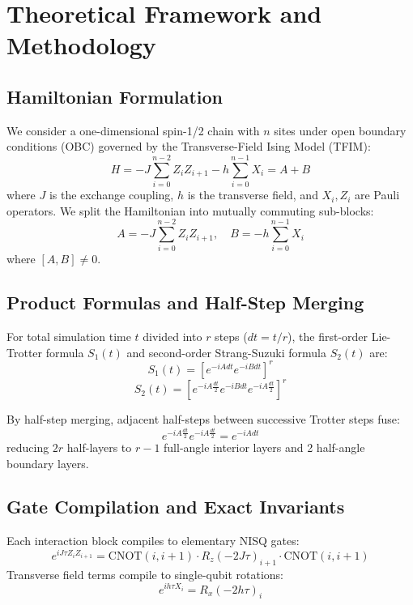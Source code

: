 \documentclass[conference]{IEEEtran}
\begin{document}
\section{Theoretical Framework and Methodology}
\subsection{Hamiltonian Formulation}
We consider a one-dimensional spin-1/2 chain with $n$ sites under open boundary conditions (OBC) governed by the Transverse-Field Ising Model (TFIM):
\begin{equation}
H = -J \sum_{i=0}^{n-2} Z_i Z_{i+1} - h \sum_{i=0}^{n-1} X_i = A + B
\label{eq:tfim}
\end{equation}
where $J$ is the exchange coupling, $h$ is the transverse field, and $X_i, Z_i$ are Pauli operators. We split the Hamiltonian into mutually commuting sub-blocks:
\begin{equation}
A = -J \sum_{i=0}^{n-2} Z_i Z_{i+1}, \quad B = -h \sum_{i=0}^{n-1} X_i
\end{equation}
where $[A, B] \ne 0$.

\subsection{Product Formulas and Half-Step Merging}
For total simulation time $t$ divided into $r$ steps ($dt = t/r$), the first-order Lie-Trotter formula $S_1(t)$ and second-order Strang-Suzuki formula $S_2(t)$ are:
\begin{equation}
S_1(t) = \left[ e^{-i A dt} e^{-i B dt} \right]^r
\end{equation}
\begin{equation}
S_2(t) = \left[ e^{-i A \frac{dt}{2}} e^{-i B dt} e^{-i A \frac{dt}{2}} \right]^r
\end{equation}

By half-step merging, adjacent half-steps between successive Trotter steps fuse:
\begin{equation}
e^{-i A \frac{dt}{2}} e^{-i A \frac{dt}{2}} = e^{-i A dt}
\end{equation}
reducing $2r$ half-layers to $r-1$ full-angle interior layers and 2 half-angle boundary layers.

\subsection{Gate Compilation and Exact Invariants}
Each interaction block compiles to elementary NISQ gates:
\begin{equation}
e^{i J \tau Z_i Z_{i+1}} = \text{CNOT}(i, i+1) \cdot R_z(-2 J \tau)_{i+1} \cdot \text{CNOT}(i, i+1)
\end{equation}
Transverse field terms compile to single-qubit rotations:
\begin{equation}
e^{i h \tau X_i} = R_x(-2 h \tau)_i
\end{equation}
\end{document}
